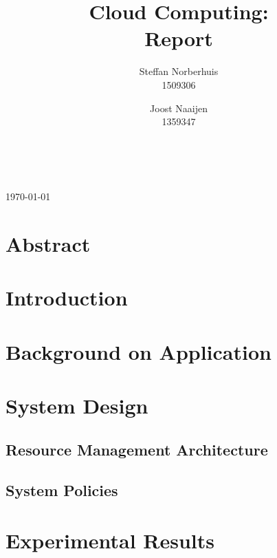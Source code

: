 \documentclass[a4paper]{IEEEtran}
\title{Cloud Computing: \\ Report}
\author{Steffan Norberhuis\\ 1509306 \and
 Joost Naaijen\\ 1359347}
\author{
    \IEEEauthorblockN{Steffan Norberhuis, Rogier Slag}\\
    \IEEEauthorblockA{1509306, todo}
}
\begin{document}
\maketitle
\begin{center}
\today
\end{center}

\section{Abstract}


\section{Introduction}




\section{Background on Application}



\section{System Design}

\subsection{Resource Management Architecture}






\subsection{System Policies}


\section{Experimental Results}
\end{document}
